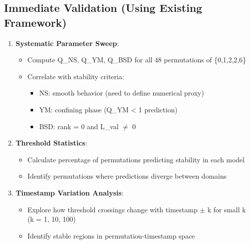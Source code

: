 \documentclass[11pt]{article}
\begin{document}
\subsection{Immediate Validation (Using Existing Framework)}
\begin{enumerate}
\item \textbf{Systematic Parameter Sweep}:
  \begin{itemize}
  \item Compute Q\_NS, Q\_YM, Q\_BSD for all 48 permutations of \{0,1,2,2,6\}
  \item Correlate with stability criteria:
    \begin{itemize}
    \item NS: smooth behavior (need to define numerical proxy)
    \item YM: confining phase (Q\_YM < 1 prediction)
    \item BSD: rank = 0 and L\_val $\neq$ 0
    \end{itemize}
  \end{itemize}
\item \textbf{Threshold Statistics}:
  \begin{itemize}
  \item Calculate percentage of permutations predicting stability in each model
  \item Identify permutations where predictions diverge between domains
  \end{itemize}
\item \textbf{Timestamp Variation Analysis}:
  \begin{itemize}
  \item Explore how threshold crossings change with timestamp $\pm$ k for small k (k = 1, 10, 100)
  \item Identify stable regions in permutation-timestamp space
  \end{itemize}
\end{enumerate}
\end{document}
